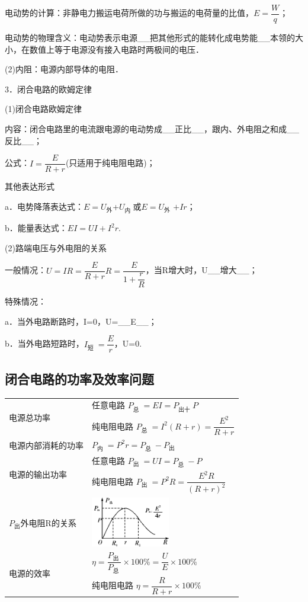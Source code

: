 电动势的计算：非静电力搬运电荷所做的功与搬运的电荷量的比值，$E=\dfrac{W}{q}$；

电动势的物理含义：电动势表示电源\_\_把其他形式的能转化成电势能\_\_本领的大小，在数值上等于电源没有接入电路时两极间的电压．

(2)内阻：电源内部导体的电阻．

3．闭合电路的欧姆定律

(1)闭合电路欧姆定律

内容：闭合电路里的电流跟电源的电动势成\_\_正比\_\_，跟内、外电阻之和成\_\_反比\_\_；

公式：$I=\dfrac{E}{R+r}$(只适用于纯电阻电路)；

其他表达形式

a．电势降落表达式：$E=U_{\text{外}}$+$U_{\text {内 }} $或$E=U_{\text{外}}$  $+I r$；

b．能量表达式：$E I=U I+I^{2} r$.

(2)路端电压与外电阻的关系

一般情况：$U=I R=\dfrac{E}{R+r} R=\dfrac{E}{1+\dfrac{r}{R}}$，当R增大时，U\_\_增大\_\_；

特殊情况：

a．当外电路断路时，I=0，U=\_\_E\_\_；

b．当外电路短路时，$I_{\text {短 }}=\dfrac{E}{r}$，U=0.

\newpage
\subsection{闭合电路的功率及效率问题}

\begin{longtable}[]{@{}m{4cm}m{10cm}@{}}
\toprule
\multirow{2}{3cm}{电源总功率} & 任意电路 $P_{\text {总 }}=E I=P_{\text {出十 }} P$\tabularnewline

& 纯电阻电路 $P_{\text {总 }}=I^{2}(R+r)=\dfrac{E^{2}}{R+r}$\tabularnewline
电源内部消耗的功率 & $P_{\text {内 }}=P^{2} r=P_{\text {总 }}-P_{\text {出 }}$\tabularnewline
\multirow{2}{3cm}{电源的输出功率} & 任意电路 $P_{\text {出 }}=U I=P_{\text {总 }}-P$\tabularnewline
& 纯电阻电路 $P_{\text {出 }}=P^{2} R=\dfrac{E^{2} R}{(R+r)^{2}}$\tabularnewline
$P_{\text{出}}$外电阻R的关系 &
\includegraphics[width=1.35833in,height=0.85833in]{media/image320.png}\tabularnewline
\multirow{2}{3cm}{电源的效率} & $\eta=\dfrac{P_{\text {出 }}}{P_{\text {总 }}} \times 100 \%=\dfrac{U}{E} \times 100 \%$\tabularnewline
& 纯电阻电路 $\eta=\dfrac{R}{R+r} \times 100 \%$\tabularnewline
\bottomrule
\end{longtable}

